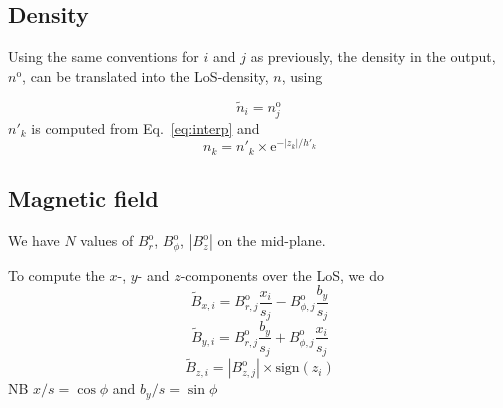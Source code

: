 \documentclass[a4paper,10pt]{article}
\newcommand{\ee}{\mathrm{e}}  %
\begin{document}
\subsection{Density}

Using the same conventions for $i$ and $j$ as previously, the density in the output,
$n^\text{o}$, can be translated into the LoS-density, $n$, using

\begin{equation}
    \widetilde n_i = n^\text{o}_j\,
\end{equation}
$n'_k$ is computed from Eq.~\eqref{eq:interp} and
\begin{equation}
 n_k = n'_k \times \ee^{-|z_k|/h'_k}
\end{equation}


\subsection{Magnetic field}

We have $N$ values of $B^\text{o}_r$, $B^\text{o}_\phi$, $|B^\text{o}_z|$
on the mid-plane.

To compute the $x$-, $y$- and $z$-components over the LoS, we do
\begin{equation}
\widetilde B_{x,i} = B^\text{o}_{r,j} \frac{x_i}{s_j} - B^\text{o}_{\phi,j} \frac{b_y}{s_j}
\end{equation}
\begin{equation}
\widetilde B_{y,i} = B^\text{o}_{r,j} \frac{b_y}{s_j} + B^\text{o}_{\phi,j} \frac{x_i}{s_j}
\end{equation}
\begin{equation}
\widetilde B_{z,i} = |B^\text{o}_{z,j}| \times \text{sign}(z_i)
\end{equation}
NB $x/s = \cos\phi$ and $b_y/s = \sin\phi$
\end{document}
